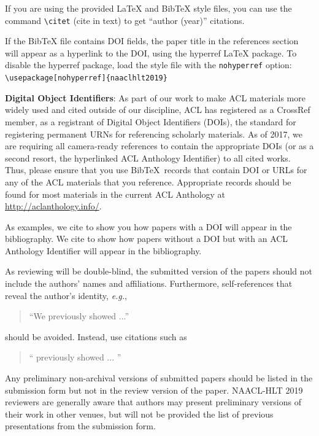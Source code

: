 \documentclass[11pt,a4paper]{article}
\begin{document}
If you are using the provided \LaTeX{} and Bib\TeX{} style files, you
can use the command \verb|\citet| (cite in text)
to get ``author (year)'' citations.

If the Bib\TeX{} file contains DOI fields, the paper
title in the references section will appear as a hyperlink
to the DOI, using the hyperref \LaTeX{} package.
To disable the hyperref package, load the style file
with the \verb|nohyperref| option: \\{\small
\verb|\usepackage[nohyperref]{naaclhlt2019}|}


\textbf{Digital Object Identifiers}:  As part of our work to make ACL
materials more widely used and cited outside of our discipline, ACL
has registered as a CrossRef member, as a registrant of Digital Object
Identifiers (DOIs), the standard for registering permanent URNs for
referencing scholarly materials.  As of 2017, we are requiring all
camera-ready references to contain the appropriate DOIs (or as a
second resort, the hyperlinked ACL Anthology Identifier) to all cited
works.  Thus, please ensure that you use Bib\TeX\ records that contain
DOI or URLs for any of the ACL materials that you reference.
Appropriate records should be found for most materials in the current
ACL Anthology at \url{http://aclanthology.info/}.

As examples, we cite \cite{P16-1001} to show you how papers with a DOI
will appear in the bibliography.  We cite \cite{C14-1001} to show how
papers without a DOI but with an ACL Anthology Identifier will appear
in the bibliography.  

As reviewing will be double-blind, the submitted version of the papers
should not include the authors' names and affiliations. Furthermore,
self-references that reveal the author's identity, {\em e.g.},
\begin{quote}
``We previously showed \cite{Gusfield:97} ...''  
\end{quote}
should be avoided. Instead, use citations such as 
\begin{quote}
``\citeauthor{Gusfield:97} 
previously showed ... ''
\end{quote}

Any preliminary non-archival versions of submitted papers should be listed in the submission form but not in the review version of the paper. NAACL-HLT 2019 reviewers are generally aware that authors may present preliminary versions of their work in other venues, but will not be provided the list of previous presentations from the submission form. 
\end{document}
